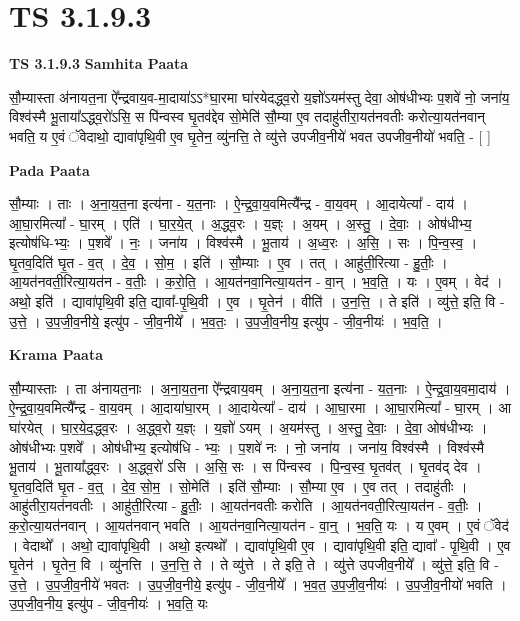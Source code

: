 \documentclass[17pt]{extarticle}
\begin{document}
\section{ TS 3.1.9.3 }

\textbf{TS 3.1.9.3 } \newline
\textbf{Samhita Paata} \newline

सौ॒म्यास्ता अ॑नायत॒ना ऐ᳚न्द्रवाय॒व-मा॒दाया॑ऽऽ*घा॒रमा घा॑रयेदद्ध्व॒रो य॒ज्ञो॑ऽयम॑स्तु देवा॒ ओष॑धीभ्यः प॒शवे॑ नो॒ जना॑य॒ विश्व॑स्मै भू॒ताया᳚ऽद्ध्व॒रो॑ऽसि॒ स पि॑न्वस्व घृ॒तव॑द्देव सो॒मेति॑ सौ॒म्या ए॒व तदाहु॑तीरा॒यत॑नवतीः करोत्या॒यत॑नवान् भवति॒ य ए॒वं ॅवेदाथो॒ द्यावा॑पृथि॒वी ए॒व घृ॒तेन॒ व्यु॑नत्ति॒ ते व्यु॑त्ते उपजीव॒नीये॑ भवत उपजीव॒नीयो॑ भवति॒ - [  ] \newline

\textbf{Pada Paata} \newline

सौ॒म्याः । ताः । अ॒ना॒य॒त॒ना इत्य॑ना - य॒त॒नाः । ऐ॒न्द्र॒वा॒य॒वमित्यै᳚न्द्र - वा॒य॒वम् । आ॒दायेत्या᳚ - दाय॑ । आ॒घा॒रमित्या᳚ - घा॒रम् । एति॑ । घा॒र॒ये॒त् । अ॒द्ध्व॒रः । य॒ज्ञ्ः । अ॒यम् । अ॒स्तु॒ । दे॒वाः॒ । ओष॑धीभ्य॒ इत्योष॑धि-भ्यः॒ । प॒शवे᳚ । नः॒ । जना॑य । विश्व॑स्मै । भू॒ताय॑ । अ॒ध्व॒रः । अ॒सि॒ । सः । पि॒न्व॒स्व॒ । घृ॒तव॒दिति॑ घृ॒त - व॒त् । दे॒व॒ । सो॒म॒ । इति॑ । सौ॒म्याः । ए॒व । तत् । आहु॑ती॒रित्या - हु॒तीः॒ । आ॒यत॑नवती॒रित्या॒यत॑न - व॒तीः॒ । क॒रो॒ति॒ । आ॒यत॑नवा॒नित्या॒यत॑न - वा॒न् । भ॒व॒ति॒ । यः । ए॒वम् । वेद॑ । अथो॒ इति॑ । द्यावा॑पृथि॒वी इति॒ द्यावा᳚-पृ॒थि॒वी । ए॒व । घृ॒तेन॑ । वीति॑ । उ॒न॒त्ति॒ । ते इति॑ । व्यु॑त्ते॒ इति॒ वि - उ॒त्ते॒ । उ॒प॒जी॒व॒नीये॒ इत्यु॑प - जी॒व॒नीये᳚ । भ॒व॒तः॒ । उ॒प॒जी॒व॒नीय॒ इत्यु॑प - जी॒व॒नीयः॑ । भ॒व॒ति॒ ।  \newline


\textbf{Krama Paata} \newline

सौ॒म्यास्ताः । ता अ॑नायत॒नाः । अ॒ना॒य॒त॒ना ऐ᳚न्द्रवाय॒वम् । अ॒ना॒य॒त॒ना इत्य॑ना - य॒त॒नाः । ऐ॒न्द्र॒वा॒य॒वमा॒दाय॑ । ऐ॒न्द्र॒वा॒य॒वमित्यै᳚न्द्र - वा॒य॒वम् । आ॒दाया॑घा॒रम् । आ॒दायेत्या᳚ - दाय॑ । आ॒घा॒रमा । आ॒घा॒रमित्या᳚ - घा॒रम् । आ घा॑रयेत् । घा॒र॒ये॒द॒द्ध्व॒रः । अ॒द्ध्व॒रो य॒ज्ञ्ः । य॒ज्ञो॑ ऽयम् । अ॒यम॑स्तु । अ॒स्तु॒ दे॒वाः॒ । दे॒वा॒ ओष॑धीभ्यः । ओष॑धीभ्यः प॒शवे᳚ । ओष॑धीभ्य॒ इत्योष॑धि - भ्यः॒ । प॒शवे॑ नः । नो॒ जना॑य । जना॑य॒ विश्व॑स्मै । विश्व॑स्मै भू॒ताय॑ । भू॒ताया᳚द्ध्व॒रः । अ॒द्ध्व॒रो॑ ऽसि । अ॒सि॒ सः । स पि॑न्वस्व । पि॒न्व॒स्व॒ घृ॒तव॑त् । घृ॒तव॑द् देव । घृ॒तव॒दिति॑ घृ॒त - व॒त्॒ । दे॒व॒ सो॒म॒ । सो॒मेति॑ । इति॑ सौ॒म्याः । सौ॒म्या ए॒व । ए॒व तत् । तदाहु॑तीः । आहु॑तीरा॒यत॑नवतीः । आहु॑ती॒रित्या - हु॒तीः॒ । आ॒यत॑नवतीः करोति । आ॒यत॑नवती॒रित्या॒यत॑न - व॒तीः॒ । क॒रो॒त्या॒यत॑नवान् । आ॒यत॑नवान् भवति । आ॒यत॑नवा॒नित्या॒यत॑न - वा॒न्॒ । भ॒व॒ति॒ यः । य ए॒वम् । ए॒वं ॅवेद॑ । वेदाथो᳚ । अथो॒ द्यावा॑पृथि॒वी । अथो॒ इत्यथो᳚ । द्यावा॑पृथि॒वी ए॒व । द्यावा॑पृथि॒वी इति॒ द्यावा᳚ - पृ॒थि॒वी । ए॒व घृ॒तेन॑ । घृ॒तेन॒ वि । व्यु॑नत्ति । उ॒न॒त्ति॒ ते । ते व्यु॑त्ते । ते इति॒ ते । व्यु॑त्ते उपजीव॒नीये᳚ । व्यु॑त्ते॒ इति॒ वि - उ॒त्ते॒ । उ॒प॒जी॒व॒नीये॑ भवतः । उ॒प॒जी॒व॒नीये॒ इत्यु॑प - जी॒व॒नीये᳚ । भ॒व॒त॒ उ॒प॒जी॒व॒नीयः॑ । उ॒प॒जी॒व॒नीयो॑ भवति । उ॒प॒जी॒व॒नीय॒ इत्यु॑प - जी॒व॒नीयः॑ । भ॒व॒ति॒ यः \newline
\end{document}
